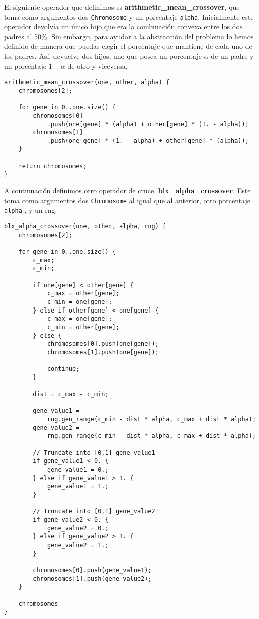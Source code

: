\documentclass[size=a4, parskip=half, titlepage=false, toc=flat, toc=bib, 12pt]{scrartcl}
\begin{document}
El siguiente operador que definimos es \textbf{arithmetic\_mean\_crossover}, que toma como argumentos dos \texttt{Chromosome} y un porcentaje \texttt{alpha}. Inicialmente este operador devolvía un único hijo que era la combinación convexa entre los dos padres al 50\%. Sin embargo, para ayudar a la abstracción del problema lo hemos definido de manera que puedas elegir el porcentaje que mantiene de cada uno de los padres. Así, devuelve dos hijos, uno que posea un porcentaje $\alpha$ de un padre y  un porcentaje $1-\alpha$ de otro y viceversa.

\begin{verbatim}
arithmetic_mean_crossover(one, other, alpha) {
    chromosomes[2];

    for gene in 0..one.size() {
        chromosomes[0]
            .push(one[gene] * (alpha) + other[gene] * (1. - alpha));
        chromosomes[1]
            .push(one[gene] * (1. - alpha) + other[gene] * (alpha));
    }

    return chromosomes;
}

\end{verbatim}

A continuación definimos otro operador de cruce, \textbf{blx\_alpha\_crossover}. Este toma como argumentos dos \texttt{Chromosome} al igual que al anterior, otro porcentaje \texttt{alpha} , y un rng.

\begin{verbatim}
blx_alpha_crossover(one, other, alpha, rng) {
    chromosomes[2];

    for gene in 0..one.size() {
        c_max;
        c_min;

        if one[gene] < other[gene] {
            c_max = other[gene];
            c_min = one[gene];
        } else if other[gene] < one[gene] {
            c_max = one[gene];
            c_min = other[gene];
        } else {
            chromosomes[0].push(one[gene]);
            chromosomes[1].push(one[gene]);

            continue;
        }

        dist = c_max - c_min;

        gene_value1 =
            rng.gen_range(c_min - dist * alpha, c_max + dist * alpha);
        gene_value2 =
            rng.gen_range(c_min - dist * alpha, c_max + dist * alpha);

        // Truncate into [0,1] gene_value1
        if gene_value1 < 0. {
            gene_value1 = 0.;
        } else if gene_value1 > 1. {
            gene_value1 = 1.;
        }

        // Truncate into [0,1] gene_value2
        if gene_value2 < 0. {
            gene_value2 = 0.;
        } else if gene_value2 > 1. {
            gene_value2 = 1.;
        }

        chromosomes[0].push(gene_value1);
        chromosomes[1].push(gene_value2);
    }

    chromosomes
}

\end{verbatim}
\end{document}
